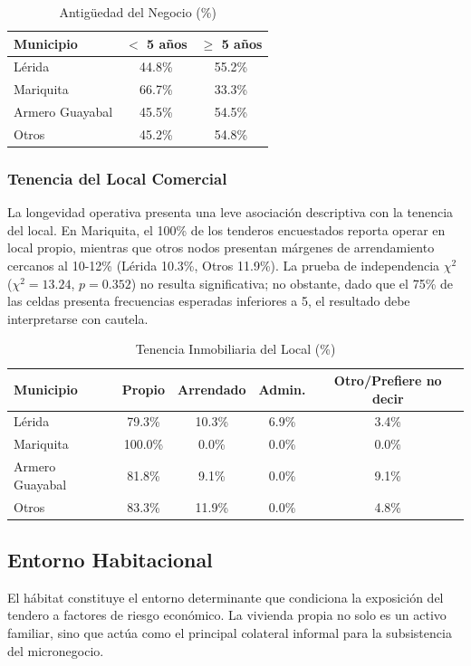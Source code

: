 \documentclass[11pt,a4paper]{article}
\begin{document}
\begin{table}[H]
\centering
\caption{Antigüedad del Negocio (\%)}
\begin{tabular}{@{}lcc@{}}
\toprule
Municipio          & $<$ 5 años      & $\geq$ 5 años \\ \midrule
Lérida             & 44.8\%     & 55.2\% \\
Mariquita          & 66.7\%     & 33.3\% \\
Armero Guayabal    & 45.5\%     & 54.5\% \\
Otros              & 45.2\%     & 54.8\% \\ \bottomrule
\end{tabular}
\end{table}

\subsubsection{Tenencia del Local Comercial}
La longevidad operativa presenta una leve asociación descriptiva con la tenencia del local. En Mariquita, el 100\% de los tenderos encuestados reporta operar en local propio, mientras que otros nodos presentan márgenes de arrendamiento cercanos al 10-12\% (Lérida 10.3\%, Otros 11.9\%). La prueba de independencia $\chi^{2}$ ($\chi^{2} = 13.24$, $p = 0.352$) no resulta significativa; no obstante, dado que el 75\% de las celdas presenta frecuencias esperadas inferiores a 5, el resultado debe interpretarse con cautela.

\begin{table}[H]
\centering
\caption{Tenencia Inmobiliaria del Local (\%)}
\begin{tabular}{@{}lcccc@{}}
\toprule
Municipio         & Propio   & Arrendado   & Admin.   & Otro/Prefiere no decir \\ \midrule
Lérida            & 79.3\%      & 10.3\%      & 6.9\%          & 3.4\% \\
Mariquita         & 100.0\%     & 0.0\%       & 0.0\%          & 0.0\% \\
Armero Guayabal   & 81.8\%      & 9.1\%       & 0.0\%          & 9.1\% \\
Otros             & 83.3\%      & 11.9\%      & 0.0\%          & 4.8\% \\ \bottomrule
\end{tabular}
\end{table}

\subsection{Entorno Habitacional}
El hábitat constituye el entorno determinante que condiciona la exposición del tendero a factores de riesgo económico. La vivienda propia no solo es un activo familiar, sino que actúa como el principal colateral informal para la subsistencia del micronegocio.
\end{document}
